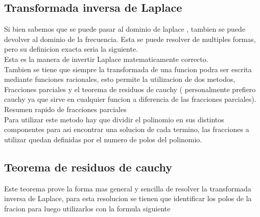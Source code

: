 \subsection {Transformada inversa de Laplace}
Si bien sabemos que se puede pasar al dominio de laplace , tambien se puede devolver al dominio de la frecuencia. Esta se puede resolver de multiples formas, pero su definicion exacta seria la siguiente.
\\
Esta es la manera de invertir Laplace matematicamente correcto.\\
Tambien se tiene que siempre la transformada de una funcion podra ser escrita mediante funciones racionales, esto permite la utilizacion de dos metodos, Fracciones parciales y el teorema de residuos de cauchy ( personalmente prefiero cauchy ya que sirve en cualquier funcion a diferencia de las fracciones parciales).\\
Resumen rapido de fracciones parciales\\
Para utilizar este metodo hay que dividir el polinomio en sus distintos componentes para asi encontrar una solucion de cada termino, las fracciones a utilizar quedan definidas por el numero de polos del polinomio.\\ 
\subsection {Teorema de residuos de cauchy}
Este teorema prove la forma mas general y sencilla de resolver la transformada inversa de Laplace, para esta resolucion se tienen que identificar los polos de la fracion para luego utilizarlos con la formula siguiente
